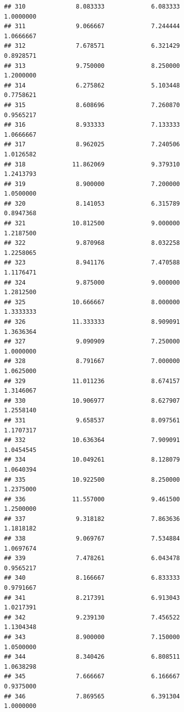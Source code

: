 \documentclass[]{article}
\begin{document}
\begin{verbatim}
## 310              8.083333             6.083333               1.0000000
## 311              9.066667             7.244444               1.0666667
## 312              7.678571             6.321429               0.8928571
## 313              9.750000             8.250000               1.2000000
## 314              6.275862             5.103448               0.7758621
## 315              8.608696             7.260870               0.9565217
## 316              8.933333             7.133333               1.0666667
## 317              8.962025             7.240506               1.0126582
## 318             11.862069             9.379310               1.2413793
## 319              8.900000             7.200000               1.0500000
## 320              8.141053             6.315789               0.8947368
## 321             10.812500             9.000000               1.2187500
## 322              9.870968             8.032258               1.2258065
## 323              8.941176             7.470588               1.1176471
## 324              9.875000             9.000000               1.2812500
## 325             10.666667             8.000000               1.3333333
## 326             11.333333             8.909091               1.3636364
## 327              9.090909             7.250000               1.0000000
## 328              8.791667             7.000000               1.0625000
## 329             11.011236             8.674157               1.3146067
## 330             10.906977             8.627907               1.2558140
## 331              9.658537             8.097561               1.1707317
## 332             10.636364             7.909091               1.0454545
## 334             10.049261             8.128079               1.0640394
## 335             10.922500             8.250000               1.2375000
## 336             11.557000             9.461500               1.2500000
## 337              9.318182             7.863636               1.1818182
## 338              9.069767             7.534884               1.0697674
## 339              7.478261             6.043478               0.9565217
## 340              8.166667             6.833333               0.9791667
## 341              8.217391             6.913043               1.0217391
## 342              9.239130             7.456522               1.1304348
## 343              8.900000             7.150000               1.0500000
## 344              8.340426             6.808511               1.0638298
## 345              7.666667             6.166667               0.9375000
## 346              7.869565             6.391304               1.0000000

\end{verbatim}
\end{document}

